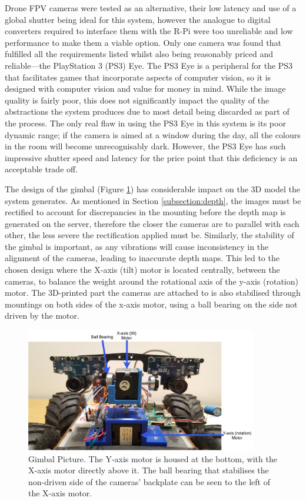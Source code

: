 Drone FPV cameras were tested as an alternative, their low latency and use of a global shutter being ideal for this system, however the analogue to digital converters required to interface them with the R-Pi were too unreliable and low performance to make them a viable option. Only one camera was found that fulfilled all the requirements listed whilst also being reasonably priced and reliable---the PlayStation 3 (PS3) Eye. The PS3 Eye is a peripheral for the PS3 that facilitates games that incorporate aspects of computer vision, so it is designed with computer vision and value for money in mind. While the image quality is fairly poor, this does not significantly impact the quality of the abstractions the system produces due to most detail being discarded as part of the process. The only real flaw in using the PS3 Eye in this system is its poor dynamic range; if the camera is aimed at a window during the day, all the colours in the room will become unrecognisably dark. However, the PS3 Eye has such impressive shutter speed and latency for the price point that this deficiency is an acceptable trade off.

The design of the gimbal (Figure \ref{fig:gimble}) has considerable impact on the 3D model the system generates. As mentioned in Section \ref{subsection:depth}, the images must be rectified to account for discrepancies in the mounting before the depth map is generated on the server, therefore the closer the cameras are to parallel with each other, the less severe the rectification applied must be. Similarly, the stability of the gimbal is important, as any vibrations will cause inconsistency in the alignment of the cameras, leading to inaccurate depth maps. This led to the chosen design where the X-axis (tilt) motor is located centrally, between the cameras, to balance the weight around the rotational axis of the y-axis (rotation) motor. The 3D-printed part the cameras are attached to is also stabilised through mountings on both sides of the x-axis motor, using a ball bearing on the side not driven by the motor. 

\begin{figure}[H]
    \begin{center}
      \includegraphics[width=0.9\textwidth]{Figures/GimbleLabel.jpg}
      \caption[Gimbal Picture]{Gimbal Picture. The Y-axis motor is housed at the bottom, with the X-axis motor directly above it. The ball bearing that stabilises the non-driven side of the cameras' backplate can be seen to the left of the X-axis motor.}
      \label{fig:gimble}
    \end{center}
\end{figure}

